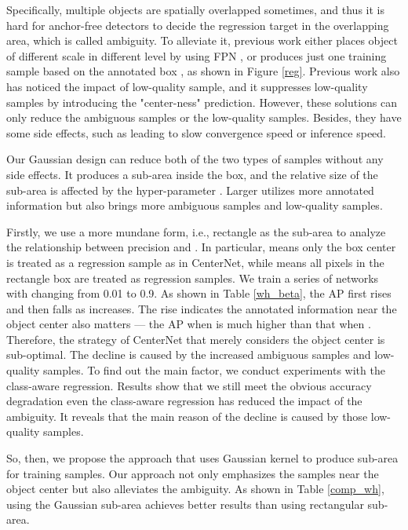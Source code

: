 \documentclass[letterpaper]{article} \usepackage{aaai20}  \usepackage{times}  \usepackage{helvet} \usepackage{courier}  \usepackage[hyphens]{url}  \usepackage{graphicx} \urlstyle{rm} \def\UrlFont{\rm}  \usepackage{graphicx}  \frenchspacing  \setlength{\pdfpagewidth}{8.5in}  \setlength{\pdfpageheight}{11in}  \usepackage{subcaption}
\begin{document}
Specifically, multiple objects are spatially overlapped sometimes, and thus it is hard for anchor-free detectors to decide the regression target in the overlapping area, which is called ambiguity. To alleviate it, previous work either places object of different scale in different level by using FPN \cite{DBLP:journals/corr/abs-1904-01355,DBLP:journals/corr/abs-1904-03797}, or produces just one training sample based on the annotated box \cite{DBLP:journals/corr/abs-1904-07850}, as shown in Figure \ref{reg}. Previous work \cite{DBLP:journals/corr/abs-1904-01355} also has noticed the impact of low-quality sample, and it suppresses low-quality samples by introducing the "center-ness" prediction. However, these solutions can only reduce the ambiguous samples or the low-quality samples. Besides, they have some side effects, such as leading to slow convergence speed or inference speed.

Our Gaussian design can reduce both of the two types of samples without any side effects. It produces a sub-area inside the box, and the relative size of the sub-area is affected by the hyper-parameter . Larger  utilizes more annotated information but also brings more ambiguous samples and low-quality samples.

Firstly, we use a more mundane form, i.e., rectangle as the sub-area to analyze the relationship between precision and . In particular,  means only the box center is treated as a regression sample as in CenterNet, while  means all pixels in the rectangle box are treated as regression samples. We train a series of networks with changing  from 0.01 to 0.9. As shown in Table \ref{wh_beta}, the AP first rises and then falls as  increases. The rise indicates the annotated information near the object center also matters --- the AP when  is much higher than that when . Therefore, the strategy of CenterNet that merely considers the object center is sub-optimal. The decline is caused by the increased ambiguous samples and low-quality samples. To find out the main factor, we conduct experiments with the class-aware regression. Results show that we still meet the obvious accuracy degradation even the class-aware regression has reduced the impact of the ambiguity. It reveals that the main reason of the decline is caused by those low-quality samples.

So, then, we propose the approach that uses Gaussian kernel to produce sub-area for training samples. Our approach not only emphasizes the samples near the object center but also alleviates the ambiguity. As shown in Table \ref{comp_wh}, using the Gaussian sub-area achieves better results than using rectangular sub-area.
\end{document}
